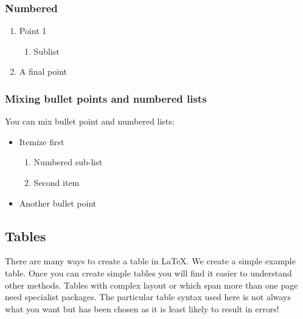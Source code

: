 \documentclass[a4paper,14pt]{extarticle}
\begin{document}
\subsubsection{Numbered}

\begin{enumerate}
\item Point 1
\begin{enumerate}
\item Sublist
\end{enumerate}
\item A final point
\end{enumerate}

\subsubsection*{Mixing bullet points and numbered lists}

You can mix bullet point and numbered lists:
\begin{itemize}
\item Itemize first
\begin{enumerate}
\item Numbered sub-list
\item Second item
\end{enumerate}
\item Another bullet point
\end{itemize}

\subsection{Tables}

There are many ways to create a table in \LaTeX. We create a simple example table. Once you can create simple tables you will find it easier to understand other methods. Tables with complex layout or which span more than one page need specialist packages. The particular table syntax used here is not always what you want but has been chosen as it is least likely to result in errors! 
\end{document}
